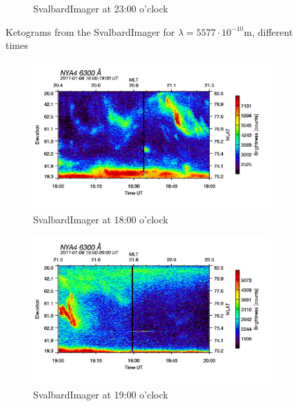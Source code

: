 \documentclass[10pt,a4paper]{article}
\begin{document}
\begin{figure}[h]
\begin{subfigure}{0.3\textwidth}
	\caption{ SvalbardImager at 23:00 o'clock \label{SBI_5_23}}
\end{subfigure}
\caption{Ketograms from the SvalbardImager for $\lambda=5577 \cdot 10^{-10} \mathrm{m}$, different times }
\end{figure}

\begin{figure}[h]
\centering
\begin{subfigure}{0.3\textwidth}
\centering
	\includegraphics[width=\textwidth]{SvalbardImager6300A18.png}
	\caption{ SvalbardImager at 18:00 o'clock \label{SBI_6_18}}
\end{subfigure}
\begin{subfigure}{0.3\textwidth}
\centering
	\includegraphics[width=\textwidth]{SvalbardImager6300A19.png}
	\caption{ SvalbardImager at 19:00 o'clock \label{SBI_6_19}}
\end{subfigure}
\begin{subfigure}{0.3\textwidth}
\centering

\end{subfigure}
\end{figure}
\end{document}
